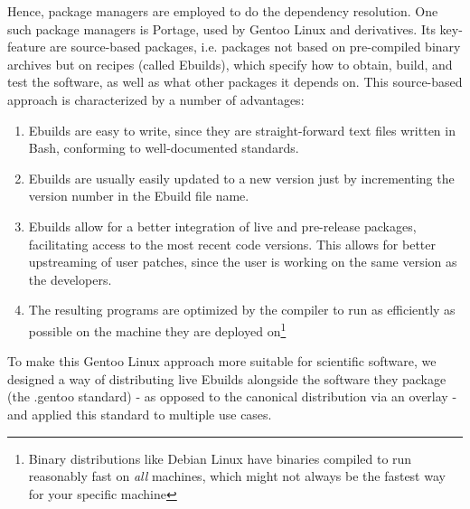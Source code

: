 \documentclass[11pt]{scrartcl}
\begin{document}
		Hence, package managers are employed to do the dependency resolution.
		One such package managers is Portage, used by Gentoo Linux and derivatives.
		Its key-feature are source-based packages, i.e. packages not based on pre-compiled binary archives but on recipes (called Ebuilds), which specify how to obtain, build, and test the software, as well as what other packages it depends on.
		This source-based approach is characterized by a number of advantages:
		\begin{enumerate}
			\item Ebuilds are easy to write, since they are straight-forward text files written in Bash, conforming to well-documented standards.
			\item Ebuilds are usually easily updated to a new version just by incrementing the version number in the Ebuild file name.
			\item Ebuilds allow for a better integration of live and pre-release packages, facilitating access to the most recent code versions.
			This allows for better upstreaming of user patches, since the user is working on the same version as the developers.
			\item The resulting programs are optimized by the compiler to run as efficiently as possible on the machine they are deployed on\footnote{Binary distributions like Debian Linux have binaries compiled to run reasonably fast on \emph{all} machines, which might not always be the fastest way for your specific machine}
		\end{enumerate}
		
		To make this Gentoo Linux approach more suitable for scientific software, we designed a way of distributing live Ebuilds alongside the software they package (the .gentoo standard) - as opposed to the canonical distribution via an overlay - and applied this standard to multiple use cases.
	
	
	
	
	\appendix
	
\end{document}
